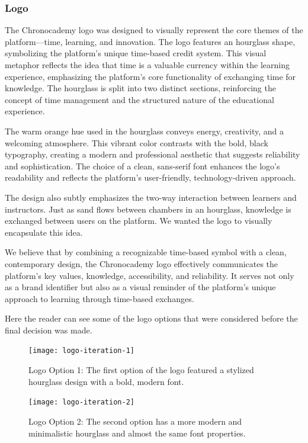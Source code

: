 \newpage
\subsubsection{Logo}\label{subsubsec:logo}
The Chronocademy logo was designed to visually represent the core themes of the platform—time, learning, and innovation.
The logo features an hourglass shape, symbolizing the platform's unique time-based credit system.
This visual metaphor reflects the idea that time is a valuable currency within the learning experience, emphasizing the platform’s core functionality of exchanging time for knowledge.
The hourglass is split into two distinct sections, reinforcing the concept of time management and the structured nature of the educational experience.

The warm orange hue used in the hourglass conveys energy, creativity, and a welcoming atmosphere.
This vibrant color contrasts with the bold, black typography, creating a modern and professional aesthetic that suggests reliability and sophistication.
The choice of a clean, sans-serif font enhances the logo’s readability and reflects the platform’s user-friendly, technology-driven approach.

The design also subtly emphasizes the two-way interaction between learners and instructors.
Just as sand flows between chambers in an hourglass, knowledge is exchanged between users on the platform.
We wanted the logo to visually encapsulate this idea.

We believe that by combining a recognizable time-based symbol with a clean, contemporary design, the Chronocademy logo effectively communicates the platform's key values, knowledge, accessibility, and reliability.
It serves not only as a brand identifier but also as a visual reminder of the platform’s unique approach to learning through time-based exchanges.

Here the reader can see some of the logo options that were considered before the final decision was made.

\begin{figure}[h]
    \centering
    \texttt{[image: logo-iteration-1]}
    \caption{Logo Option 1: The first option of the logo featured a stylized hourglass design with a bold, modern font.}
    \label{fig:figure4}
\end{figure}

\begin{figure}[h]
    \centering
    \texttt{[image: logo-iteration-2]}
    \caption{Logo Option 2: The second option has a more modern and minimalistic hourglass and almost the same font properties.}
    \label{fig:figure5}
\end{figure}

